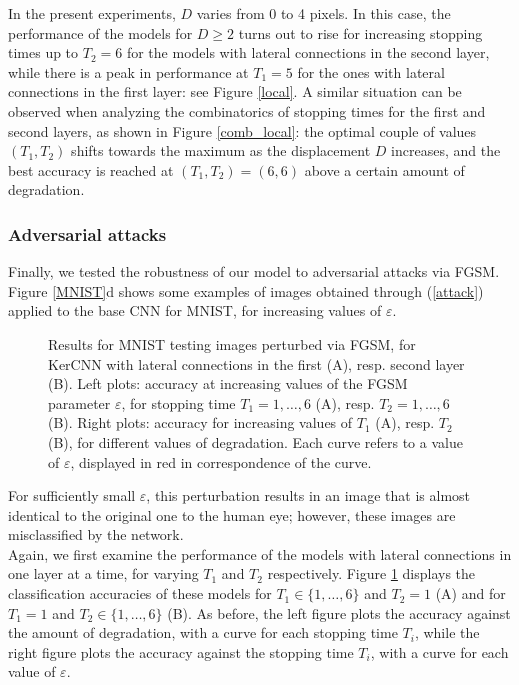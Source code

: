 \documentclass[11pt,oneside,reqno]{amsart}
\renewcommand{\baselinestretch}{1.5} \interfootnotelinepenalty=10000
\begin{document}
 In the present experiments, $D$ varies from 0 to 4 pixels. In this case, the performance of the models for $D\geq2$ turns out to rise for increasing stopping times up to $T_2=6$ for the models with lateral connections in the second layer, while there is a peak in performance at $T_1=5$ for the ones with lateral connections in the first layer: see Figure \ref{local}. A similar situation can be observed when analyzing the combinatorics of stopping times for the first and second layers, as shown in Figure \ref{comb_local}: the optimal couple of values $(T_1,T_2)$ shifts towards the maximum as the displacement $D$ increases, and the best accuracy is reached at $(T_1,T_2)=(6,6)$ above a certain amount of degradation.
 
 
 \subsubsection{Adversarial attacks}  
  Finally, we tested the robustness of our model to adversarial attacks via FGSM. Figure \ref{MNIST}d shows some examples of images obtained through (\ref{attack}) applied to the base CNN for MNIST, for increasing values of $\varepsilon$. 
  \begin{figure}[htbp!]
  \centering
 {\renewcommand{\baselinestretch}{0}
 \;
 }
 \caption{Results for MNIST testing images perturbed via FGSM, for KerCNN with lateral connections in the first (A), resp. second layer (B). Left plots: accuracy at increasing values of the FGSM parameter $\varepsilon$, for stopping time $T_1=1,\ldots,6$ (A), resp. $T_2=1,\ldots,6$ (B). Right plots: accuracy for increasing values of $T_1$ (A), resp. $T_2$ (B), for different values of degradation. Each curve refers to a value of $\varepsilon$, displayed in red in correspondence of the curve.}\label{fgsm}
 \end{figure}
 For sufficiently small $\varepsilon$, this perturbation results in an image that is almost identical to the original one to the human eye; however, these images are misclassified by the network.\\
  Again, we first examine the performance of the models with lateral connections in one layer at a time, for varying $T_1$ and $T_2$ respectively. Figure \ref{fgsm} displays the classification accuracies of these models for $T_1 \in \{1,\ldots,6\}$ and $T_2=1$ (A) and for $T_1=1$ and $T_2 \in \{1,\ldots,6\}$ (B). As before, the left figure plots the accuracy against the amount of degradation, with a curve for each stopping time $T_i$, while the right figure plots the accuracy against the stopping time $T_i$, with a curve for each value of $\varepsilon$. 
\end{document}
